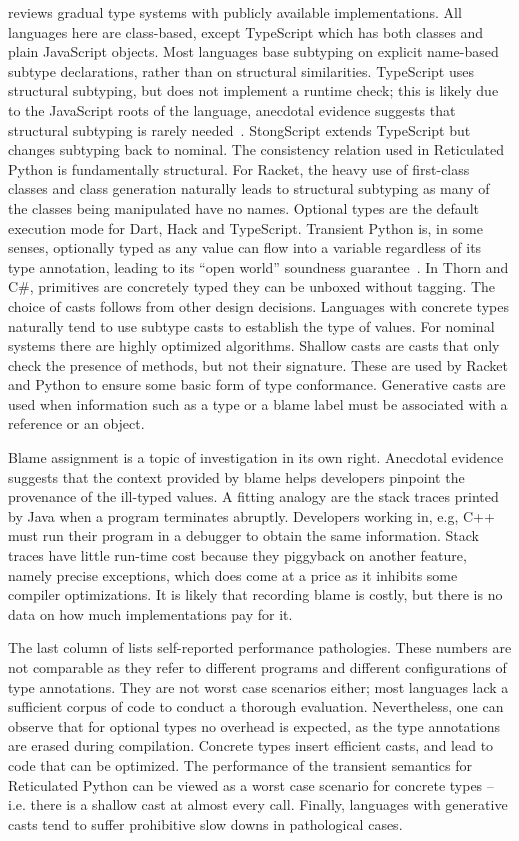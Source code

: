 \documentclass[a4paper,USenglish]{tex/lipics-v2016}
\begin{document}
\noindent
{} reviews gradual type systems with publicly available
implementations. All languages here are class-based, except TypeScript which
has both classes and plain JavaScript objects. Most languages base subtyping
on explicit name-based subtype declarations, rather than on structural
similarities.  TypeScript uses structural subtyping, but does not implement
a runtime check; this is likely due to the JavaScript roots of the language,
anecdotal evidence suggests that structural subtyping is rarely
needed~\cite{ecoop15}. StongScript extends TypeScript but changes subtyping
back to nominal.  The consistency relation used in Reticulated Python is
fundamentally structural.  For Racket, the heavy use of first-class classes
and class generation naturally leads to structural subtyping as many of the
classes being manipulated have no names.  Optional types are the default
execution mode for Dart, Hack and TypeScript.  Transient Python is, in some
senses, optionally typed as any value can flow into a variable regardless of
its type annotation, leading to its ``open world'' soundness
guarantee~\cite{siek14}.  In Thorn and C\#, primitives are concretely
typed they can be unboxed without tagging.  The choice of casts follows from
other design decisions. Languages with concrete types naturally tend to use
subtype casts to establish the type of values. For nominal systems there are
highly optimized algorithms. Shallow casts are casts that only check the
presence of methods, but not their signature. These are used by Racket and Python
to ensure some basic form of type conformance. Generative casts are used
when information such as a type or a blame label must be associated with a
reference or an object.

Blame assignment is a topic of investigation in its own right. Anecdotal
evidence suggests that the context provided by blame helps developers
pinpoint the provenance of the ill-typed values. A fitting analogy are the
stack traces printed by Java when a program terminates abruptly. Developers
working in, e.g, C++ must run their program in a debugger to obtain the same
information. Stack traces have little run-time cost because they piggyback
on another feature, namely precise exceptions, which does come at a price as
it inhibits some compiler optimizations. It is likely that recording blame
is costly, but there is no data on how much implementations pay for it.

The last column of  lists self-reported performance pathologies.
These numbers are not comparable as they refer to different programs and
different configurations of type annotations. They are not worst case scenarios
either; most languages lack a sufficient corpus of code to conduct a thorough
evaluation.  Nevertheless, one can observe that for optional types no overhead
is expected, as the type annotations are erased during compilation. Concrete
types insert efficient casts, and lead to code that can be optimized.  The
performance of the transient semantics for Reticulated Python can be viewed as a
worst case scenario for concrete types -- i.e. there is a shallow cast at almost
every call. Finally, languages with generative casts tend to suffer prohibitive
slow downs in pathological cases.
\end{document}
